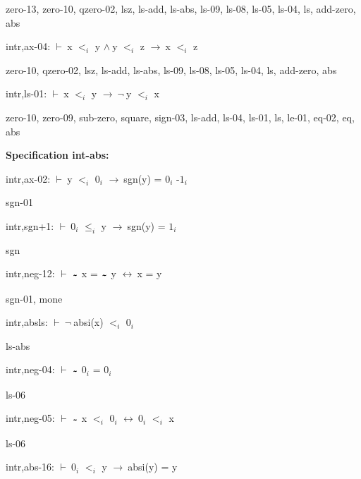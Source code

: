\documentclass[a4paper]{article}
\newcommand{\tildesym}{\raisebox{-4pt}{\bf\~{}}}
\newcommand{\Fol}{\mbox{$\vdash\ $}}
\newcommand{\Not}{\mbox{$\neg\ $}}
\newcommand{\And}{\mbox{$\wedge\ $}}
\newcommand{\Imp}{\mbox{$\rightarrow\ $}}
\newcommand{\Equiv}{\mbox{$\leftrightarrow\ $}}
\begin{document}
zero-13, zero-10, qzero-02, lsz, ls-add, ls-abs, ls-09, ls-08, ls-05, ls-04, ls, add-zero, abs

\bigskip

intr,ax-04: 
 \Fol x $\mbox{$<$}_{i}$ y \And y $\mbox{$<$}_{i}$ z \Imp x $\mbox{$<$}_{i}$ z



zero-10, qzero-02, lsz, ls-add, ls-abs, ls-09, ls-08, ls-05, ls-04, ls, add-zero, abs

\bigskip

intr,ls-01: 
 \Fol x $\mbox{$<$}_{i}$ y \Imp \Not y $\mbox{$<$}_{i}$ x



zero-10, zero-09, sub-zero, square, sign-03, ls-add, ls-04, ls-01, ls, le-01, eq-02, eq, abs

\bigskip

{\bf Specification int-abs:}

intr,ax-02: 
 \Fol y $\mbox{$<$}_{i}$ $\mbox{0}_{i}$ \Imp sgn(y) = $\mbox{0}_{i}$ $\mbox{-1}_{i}$



sgn-01

\bigskip

intr,sgn+1: 
 \Fol $\mbox{0}_{i}$ $\mbox{$\le$}_{i}$ y \Imp sgn(y) = $\mbox{1}_{i}$



sgn

\bigskip

intr,neg-12: 
 \Fol $\tildesym$ x = $\tildesym$ y \Equiv x = y



sgn-01, mone

\bigskip

intr,absls: 
 \Fol \Not absi(x) $\mbox{$<$}_{i}$ $\mbox{0}_{i}$



ls-abs

\bigskip

intr,neg-04: 
 \Fol $\tildesym$ $\mbox{0}_{i}$ = $\mbox{0}_{i}$



ls-06

\bigskip

intr,neg-05: 
 \Fol $\tildesym$ x $\mbox{$<$}_{i}$ $\mbox{0}_{i}$ \Equiv $\mbox{0}_{i}$ $\mbox{$<$}_{i}$ x



ls-06

\bigskip

intr,abs-16: 
 \Fol $\mbox{0}_{i}$ $\mbox{$<$}_{i}$ y \Imp absi(y) = y
\end{document}
